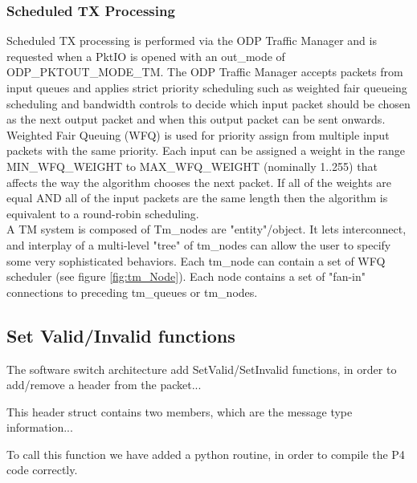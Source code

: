 
\subsubsection{Scheduled TX Processing}

Scheduled TX processing is performed via the ODP Traffic Manager and is requested when a PktIO is opened with an out\_mode of ODP\_PKTOUT\_MODE\_TM. 
The ODP Traffic Manager accepts packets from input queues and applies strict priority scheduling such as weighted fair queueing scheduling and bandwidth controls to decide which input packet should be chosen as the next output packet and when this output packet can be sent onwards.\\
Weighted Fair Queuing (WFQ) is used for priority assign from multiple input packets with the same priority. Each input can be assigned a weight in the range MIN\_WFQ\_WEIGHT to MAX\_WFQ\_WEIGHT (nominally 1..255) that affects the way the algorithm chooses the next packet. If all of the weights are equal AND all of the input packets are the same length then the algorithm is equivalent to a round-robin scheduling.\\

A TM system is composed of Tm\_nodes are "entity"/object. It lets interconnect, and interplay of a multi-level "tree" of tm\_nodes can allow the user to specify some very sophisticated behaviors. Each tm\_node can contain a set of WFQ scheduler (see figure \ref{fig:tm_Node}).  Each node contains a set of "fan-in" connections to preceding tm\_queues or tm\_nodes.




\subsection{Set Valid/Invalid functions}
\label{sec:sec41}

The software switch architecture add SetValid/SetInvalid functions, in order to add/remove a header from the packet...  

This header struct contains two members, which are the message type information... 

 

%


To call this function we have added a python routine, in order to compile the P4 code correctly.

